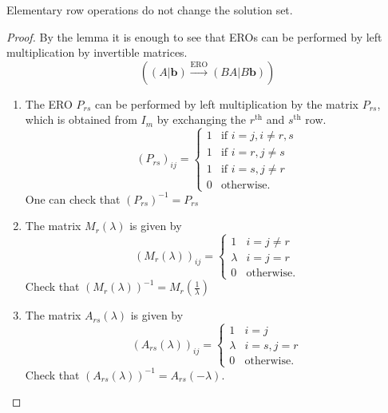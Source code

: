 \documentclass[10pt, a4paper]{article}
\newcommand{\mbf}[1]{\mathbf{#1}}
\begin{document}
\begin{proposition}
    Elementary row operations do not change the solution set.
    \begin{proof}
        By the lemma it is enough to see that EROs can be performed by left multiplication by invertible matrices.
        \[
        \left((A | \mbf{b}) \xrightarrow{\text{ERO}} (BA | B\mbf{b})\right)
        \]
        \begin{enumerate}[label = (\roman*)]
            \item The ERO $P_{rs}$ can be performed by left multiplication by the matrix $P_{rs}$,
            which is obtained from $I_m$ by exchanging the $r^{\text{th}}$ and $s^{\text{th}}$ row.
            \[
            (P_{rs})_{ij} = \begin{cases}
                1 &\text{if } i = j, i \neq r, s \\
                1 &\text{if } i = r, j \neq s \\
                1 &\text{if } i = s, j \neq r \\
                0 &\text{otherwise}.
            \end{cases}
            \]
            One can check that
            $(P_{rs}) ^ {-1} = P_{rs}$
            \item The matrix $M_r(\lambda)$ is given by
            \[
            (M_r(\lambda))_{ij} = \begin{cases}
                1 &i = j \neq r \\
                \lambda &i = j = r \\
                0 &\text{otherwise}.
            \end{cases}
            \]
            Check that
            $(M_r(\lambda)) ^ {-1} = M_r\left(\frac{1}{\lambda}\right)$
            \item The matrix $A_{rs}(\lambda)$ is given by
            \[
            (A_{rs}(\lambda))_{ij} = \begin{cases}
                1 &i = j \\
                \lambda &i = s, j = r \\
                0 &\text{otherwise}.
            \end{cases}
            \]
            Check that $(A_{rs}(\lambda)) ^ {-1} = A_{rs}(-\lambda)$.
        \end{enumerate}
    \end{proof}
\end{proposition}
\end{document}
